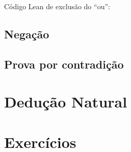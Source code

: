 Código Lean de exclusão do ``ou'':


\subsection{Negação}
\subsection{Prova por contradição}

\section{Dedução Natural}

\section{Exercícios}
